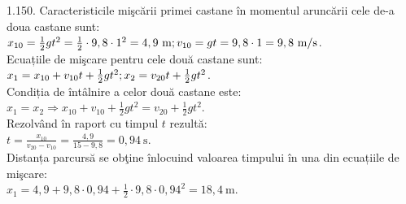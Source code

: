 1.150. Caracteristicile mişcării primei castane în momentul aruncării cele de-a doua castane sunt:\\ $x_{10}=\frac{1}{2} g t^{2}=\frac{1}{2} \cdot 9,8 \cdot 1^{2}=4,9 \mathrm{~m};\\ v_{10}=g t=9,8 \cdot 1=9,8 \mathrm{~m} / \mathrm{s}$.\\ Ecuațiile de mişcare pentru cele două castane sunt:\\ $x_{1}=x_{10}+v_{10} t+\frac{1}{2} g t^{2};\\ x_{2}=v_{20} t+\frac{1}{2} g t^{2}$.\\ Condiția de întâlnire a celor două castane este:\\ $x_{1}=x_{2} \Rightarrow x_{10}+v_{10}+\frac{1}{2} g t^{2}=v_{20}+\frac{1}{2} g t^{2}$.\\ Rezolvând în raport cu timpul $t$ rezultă:\\ $t=\frac{x_{10}}{v_{20}-v_{10}}=\frac{4,9}{15-9,8}=0,94 \mathrm{~s}$.\\ Distanța parcursă se obţine înlocuind valoarea timpului în una din ecuațiile de mişcare:\\ $x_{1}=4,9+9,8 \cdot 0,94+\frac{1}{2} \cdot 9,8 \cdot 0,94^{2}=18,4 \mathrm{~m}$.\\

